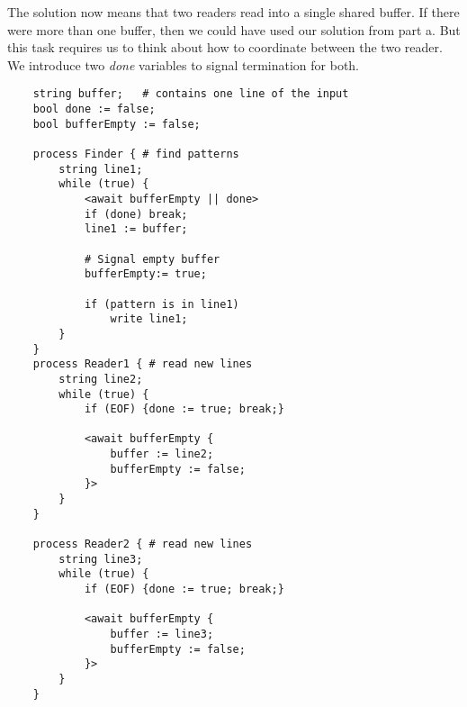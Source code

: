 The solution now means that two readers read into a single shared buffer. If there were more than one buffer, then we could have used our solution from part a.
But this task requires us to think about how to coordinate between the two reader. We introduce two \textit{done} variables to signal termination for both. 

\begin{lstlisting}
    string buffer;   # contains one line of the input
    bool done := false;
    bool bufferEmpty := false; 

    process Finder { # find patterns
        string line1;
        while (true) {
            <await bufferEmpty || done>
            if (done) break;
            line1 := buffer;

            # Signal empty buffer 
            bufferEmpty:= true;
         
            if (pattern is in line1)
                write line1;
        }
    }
    process Reader1 { # read new lines
        string line2;
        while (true) {
            if (EOF) {done := true; break;}

            <await bufferEmpty {
                buffer := line2;
                bufferEmpty := false; 
            }>
        }
    }

    process Reader2 { # read new lines
        string line3;
        while (true) {
            if (EOF) {done := true; break;}

            <await bufferEmpty {
                buffer := line3;
                bufferEmpty := false; 
            }>
        }
    }
\end{lstlisting}